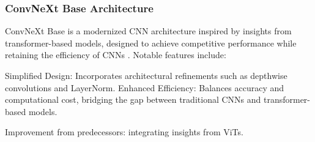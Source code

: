 



\subsubsection{ConvNeXt Base Architecture}
\label{sec:convnext}
ConvNeXt Base is a modernized CNN architecture inspired by insights from transformer-based models, designed to achieve competitive performance while retaining the efficiency of CNNs \cite{todi2023convnext}. Notable features include:

Simplified Design: Incorporates architectural refinements such as depthwise convolutions and LayerNorm.
Enhanced Efficiency: Balances accuracy and computational cost, bridging the gap between traditional CNNs and transformer-based models. 

Improvement from predecessors: integrating insights from ViTs.

